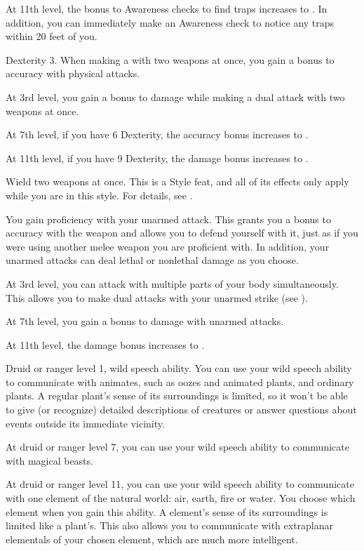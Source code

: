     At 11th level, the bonus to Awareness checks to find traps increases to .
    In addition, you can immediately make an Awareness check to notice any traps within 20 feet of you.

    \featpre Dexterity 3.
    \featben When making a  with two weapons at once, you gain a  bonus to accuracy with physical attacks.

    At 3rd level, you gain a  bonus to damage while making a dual attack with two weapons at once.

    At 7th level, if you have 6 Dexterity, the accuracy bonus increases to .

    At 11th level, if you have 9 Dexterity, the damage bonus increases to .

    \stylereq Wield two weapons at once.
     This is a Style feat, and all of its effects only apply while you are in this style.
    For details, see .

    \featben You gain proficiency with your unarmed attack.
    This grants you a  bonus to accuracy with the weapon and allows you to defend yourself with it, just as if you were using another melee weapon you are proficient with.
    In addition, your unarmed attacks can deal lethal or nonlethal damage as you choose.

    At 3rd level, you can attack with multiple parts of your body simultaneously.
    This allows you to make dual attacks with your unarmed strike (see ).

    At 7th level, you gain a  bonus to damage with unarmed attacks.

    At 11th level, the damage bonus increases to .

    \featpres Druid or ranger level 1, wild speech ability.
    \featben You can use your wild speech ability to communicate with animates, such as oozes and animated plants, and ordinary plants. A regular plant's sense of its surroundings is limited, so it won't be able to give (or recognize) detailed descriptions of creatures or answer questions about events outside its immediate vicinity.

    At druid or ranger level 7, you can use your wild speech ability to communicate with magical beasts.

    At druid or ranger level 11, you can use your wild speech ability to communicate with one element of the natural world: air, earth, fire or water.
    You choose which element when you gain this ability.
    A element's sense of its surroundings is limited like a plant's.
    This also allows you to communicate with extraplanar elementals of your chosen element, which are much more intelligent.


